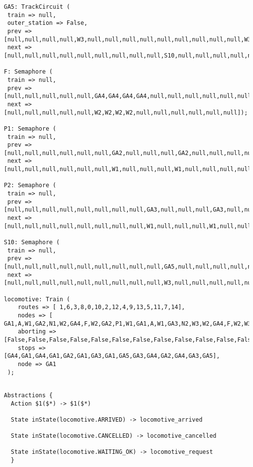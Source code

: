 \begin{lstlisting}[caption={oggetti istanziati nella simulazione}]
GA5: TrackCircuit (
 train => null, 
 outer_station => False,
 prev => [null,null,null,null,W3,null,null,null,null,null,null,null,null,null,W3],
 next => [null,null,null,null,null,null,null,null,null,S10,null,null,null,null,null]);

F: Semaphore (
 train => null,
 prev => [null,null,null,null,null,GA4,GA4,GA4,GA4,null,null,null,null,null,null],
 next => [null,null,null,null,null,W2,W2,W2,W2,null,null,null,null,null,null]);

P1: Semaphore (
 train => null,
 prev => [null,null,null,null,null,null,GA2,null,null,null,GA2,null,null,null,null],
 next => [null,null,null,null,null,null,W1,null,null,null,W1,null,null,null,null]);

P2: Semaphore (
 train => null,
 prev => [null,null,null,null,null,null,null,null,GA3,null,null,null,GA3,null,null],
 next => [null,null,null,null,null,null,null,null,W1,null,null,null,W1,null,null]);

S10: Semaphore (
 train => null,
 prev => [null,null,null,null,null,null,null,null,null,GA5,null,null,null,null,null],
 next => [null,null,null,null,null,null,null,null,null,W3,null,null,null,null,null]);
 
locomotive: Train (
 	routes => [ 1,6,3,8,0,10,2,12,4,9,13,5,11,7,14],
 	nodes => [ GA1,A,W1,GA2,N1,W2,GA4,F,W2,GA2,P1,W1,GA1,A,W1,GA3,N2,W3,W2,GA4,F,W2,W3,GA3,P2,W1,GA1,A,W1,GA2,P1,W1,GA1,A,W1,GA3,P2,W1,GA1,A,W1,GA3,N2,W3,GA5,S10,W3,GA3,N2,W3,W2,GA4,F,W2,GA2,N1,W2,GA4,F,W2,W3,GA3,N2,W3,GA5],
 	aborting => [False,False,False,False,False,False,False,False,False,False,False,False,False,False,False,False,False,False,False,False,False,False,False,False,False,False,False,False,False,False,False,False,False,False,False,False,False,False,False,False,False,False,False,False,False,False,False,False,False,False,False,False,False,False,False,False,False,False,False,False,False,False,False,False,False],
 	stops => [GA4,GA1,GA4,GA1,GA2,GA1,GA3,GA1,GA5,GA3,GA4,GA2,GA4,GA3,GA5],
 	node => GA1
 );
 
\end{lstlisting}

\begin{lstlisting}[caption={Astrazioni per la verifica della proprietà di stabilizzazione}]
Abstractions {
  Action $1($*) -> $1($*)
    
  State inState(locomotive.ARRIVED) -> locomotive_arrived

  State inState(locomotive.CANCELLED) -> locomotive_cancelled

  State inState(locomotive.WAITING_OK) -> locomotive_request
  }
\end{lstlisting}